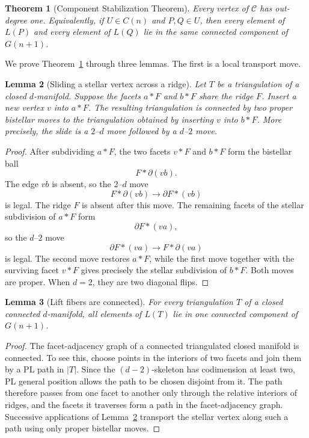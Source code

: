 \documentclass[11pt]{article}
\newtheorem{theorem}{Theorem}
\newtheorem{lemma}[theorem]{Lemma}
\theoremstyle{remark}
\theoremstyle{plain}
\begin{document}
\begin{theorem}[Component Stabilization Theorem]
\label{thm:component-stabilization}
Every vertex of \(\mathcal C\) has out-degree one.  Equivalently, if
\(U\in C(n)\) and \(P,Q\in U\), then every element of \(L(P)\) and every
element of \(L(Q)\) lie in the same connected component of \(G(n+1)\).
\end{theorem}

We prove Theorem~\ref{thm:component-stabilization} through three lemmas.  The
first is a local transport move.

\begin{lemma}[Sliding a stellar vertex across a ridge]
\label{lem:slide}
Let \(T\) be a triangulation of a closed \(d\)-manifold.  Suppose the facets
\(a*F\) and \(b*F\) share the ridge \(F\).  Insert a new vertex \(v\) into
\(a*F\).  The resulting triangulation is connected by two proper bistellar
moves to the triangulation obtained by inserting \(v\) into \(b*F\).
More precisely, the slide is a \(2\)--\(d\) move followed by a
\(d\)--\(2\) move.
\end{lemma}

\begin{proof}
After subdividing \(a*F\), the two facets \(v*F\) and \(b*F\) form the
bistellar ball
\[
 F*\partial(vb).
\]
The edge \(vb\) is absent, so the \(2\)--\(d\) move
\[
 F*\partial(vb)\longrightarrow \partial F*(vb)
\]
is legal.  The ridge \(F\) is absent after this move.  The remaining facets
of the stellar subdivision of \(a*F\) form
\[
 \partial F*(va),
\]
so the \(d\)--\(2\) move
\[
 \partial F*(va)\longrightarrow F*\partial(va)
\]
is legal.  The second move restores \(a*F\), while the first move together
with the surviving facet \(v*F\) gives precisely the stellar subdivision of
\(b*F\).  Both moves are proper.  When \(d=2\), they are two diagonal flips.
\end{proof}

\begin{lemma}[Lift fibers are connected]
\label{lem:fibers-connected}
For every triangulation \(T\) of a closed connected \(d\)-manifold, all
elements of \(L(T)\) lie in one connected component of \(G(n+1)\).
\end{lemma}

\begin{proof}
The facet-adjacency graph of a connected triangulated closed manifold is
connected.  To see this, choose points in the interiors of two facets and
join them by a PL path in \(|T|\).  Since the \((d-2)\)-skeleton has
codimension at least two, PL general position allows the path to be chosen
disjoint from it.  The path therefore passes from one facet to another only
through the relative interiors of ridges, and the facets it traverses form a
path in the facet-adjacency graph.  Successive applications of
Lemma~\ref{lem:slide} transport the stellar vertex along such a path using
only proper bistellar moves.
\end{proof}
\end{document}
